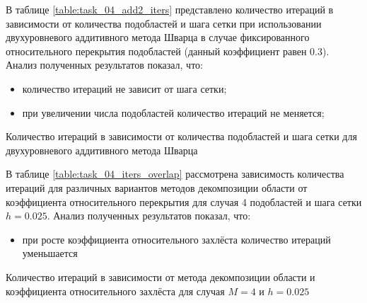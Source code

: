 \documentclass[a4paper]{article}
\begin{document}
\newpage

В таблице \ref{table:task_04_add2_iters} представлено количество итераций в зависимости от количества подобластей и шага сетки при использовании двухуровневого аддитивного метода Шварца в случае фиксированного относительного перекрытия подобластей (данный коэффициент равен 0.3). Анализ полученных результатов показал, что:
\begin{itemize}
\item количество итераций не зависит от шага сетки;
\item при увеличении числа подобластей количество итераций не меняется;
\end{itemize}

\begin{table}[h]
\caption{Количество итераций в зависимости от количества подобластей и шага сетки для двухуровневого аддитивного метода Шварца}
\label{table:task_04_add2_iters_coarse_1}
\end{table}

В таблице \ref{table:task_04_iters_overlap} рассмотрена зависимость количества итераций для различных вариантов методов декомпозиции области от коэффициента относительного перекрытия для случая 4 подобластей и шага сетки $h = 0.025$. Анализ полученных результатов показал, что:
\begin{itemize}
\item при росте коэффициента относительного захлёста количество итераций уменьшается
\end{itemize}

\begin{table}[h]
\caption{Количество итераций в зависимости от метода декомпозиции области и коэффициента относительного захлёста для случая $M = 4$ и $h = 0.025$}
\label{table:task_04_iters_overlap_coarse_1}
\end{table}
\end{document}
